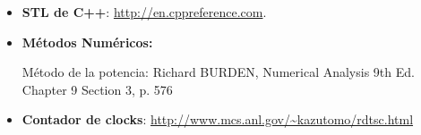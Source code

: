 \begin{itemize}
	\item \textbf{STL de C++}: \url{http://en.cppreference.com}.
	\item \textbf{Métodos Numéricos:}
		\par Método de la potencia: Richard BURDEN, Numerical Analysis 9th Ed. Chapter 9 Section 3, p. 576
	\item \textbf{Contador de clocks}: \url{http://www.mcs.anl.gov/\~kazutomo/rdtsc.html}
\end{itemize}



